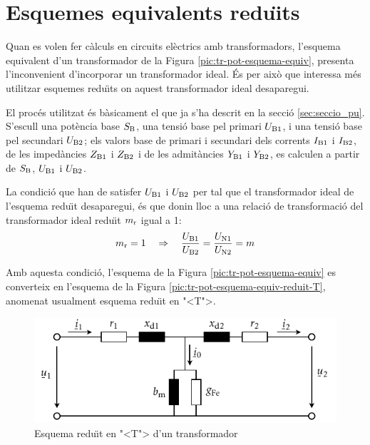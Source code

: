 \section{Esquemes equivalents redu\"{\i}ts}

Quan es volen fer c\`{a}lculs en circuits el\`{e}ctrics amb transformadors, l'esquema equivalent d'un transformador de la Figura  \vref{pic:tr-pot-esquema-equiv}, presenta l'inconvenient d'incorporar un transformador ideal. \'{E}s per aix\`{o} que interessa m\'{e}s utilitzar esquemes redu\"{\i}ts on aquest transformador ideal desaparegui.

El proc\'{e}s utilitzat \'{e}s b\`{a}sicament el que ja s'ha descrit en la secci\'{o} \vref{sec:seccio_pu}. S'escull una pot\`{e}ncia base $S_\mathrm{B}$, una tensi\'{o} base pel primari $U_\mathrm{B1}$, i una tensi\'{o} base pel secundari $U_\mathrm{B2}$; els valors base de primari i secundari dels corrents $I_\mathrm{B1}$ i $I_\mathrm{B2}$, de les imped\`{a}ncies $Z_\mathrm{B1}$ i $Z_\mathrm{B2}$ i de les admit\`{a}ncies $Y_\mathrm{B1}$ i $Y_\mathrm{B2}$, es calculen a partir de $S_\mathrm{B}$, $U_\mathrm{B1}$ i $U_\mathrm{B2}$.

La condici\'{o} que han de satisfer $U_\mathrm{B1}$ i $U_\mathrm{B2}$ per tal que el transformador ideal de l'esquema redu\"{\i}t desaparegui, \'{e}s que donin lloc a una relaci\'{o} de transformaci\'{o} del transformador ideal redu\"{\i}t $m_\mathrm{r}$ igual a  1:
\begin{equation}\label{eq:mr}
    m_\mathrm{r} = 1 \quad \Rightarrow \quad \frac{U_\mathrm{B1}}{U_\mathrm{B2}} = \frac{U_\mathrm{N1}}{U_\mathrm{N2}} = m
\end{equation}

 Amb aquesta condici\'{o}, l'esquema de la Figura \vref{pic:tr-pot-esquema-equiv} es converteix en l'esquema de la Figura
\vref{pic:tr-pot-esquema-equiv-reduit-T}, anomenat usualment esquema redu\"{\i}t en {"<}T{">}.

\begin{figure}[htb]
\centering
    \includegraphics{Imatges/Cap-TrafosPot-Esq-Equiv-Reduit-T.pdf}
\caption{Esquema redu\"{\i}t en {"<}T{">} d'un transformador}
\label{pic:tr-pot-esquema-equiv-reduit-T}
\end{figure}

